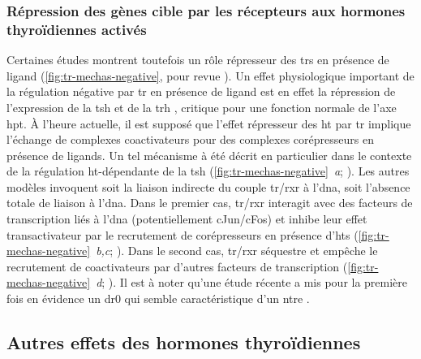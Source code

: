 \documentclass[../main.tex]{subfiles}
\begin{document}


\subsubsection{Répression des gènes cible par les récepteurs aux hormones thyroïdiennes activés}
Certaines études montrent toutefois un rôle répresseur des \glspl{tr} en présence de ligand (\autoref{fig:tr-mechas-negative}, pour revue \citealp{Lazar2003,Weitzel2008}).
Un effet physiologique important de la régulation négative par \gls{tr} en présence de ligand est en effet la répression de l'expression de la \gls{tsh} et de la \gls{trh} \citep{Dupre2004}, critique pour une fonction normale de l'axe \gls{hpt}.
À l'heure actuelle, il est supposé que l'effet répresseur des \gls{ht} par \gls{tr} implique l'échange de complexes coactivateurs pour des complexes corépresseurs en présence de ligands.
Un tel mécanisme à été décrit en particulier dans le contexte de la régulation \gls{ht}-dépendante de la \gls{tsh} (\autoref{fig:tr-mechas-negative}~\textit{a}; \citealp{Sasaki1999}).
Les autres modèles invoquent soit la liaison indirecte du couple \gls{tr}/\gls{rxr} à l'\gls{dna}, soit l'absence totale de liaison à l'\gls{dna}.
Dans le premier cas, \gls{tr}/\gls{rxr} interagit avec des facteurs de transcription liés à l'\gls{dna} (potentiellement cJun/cFos) et inhibe leur effet transactivateur par le recrutement de corépresseurs en présence d'\glspl{ht} (\autoref{fig:tr-mechas-negative}~\textit{b,c}; \citealp{Matsushita2007}).
Dans le second cas, \gls{tr}/\gls{rxr} séquestre et empêche le recrutement de coactivateurs par d'autres facteurs de transcription (\autoref{fig:tr-mechas-negative}~\textit{d}; \citealp{Wulf2008}).
Il est à noter qu'une étude récente a mis pour la première fois en évidence un \gls{dr0} qui semble caractéristique d'un \gls{ntre} \citep{Ramadoss2014}.




\subsection{Autres effets des hormones thyroïdiennes}
\end{document}
